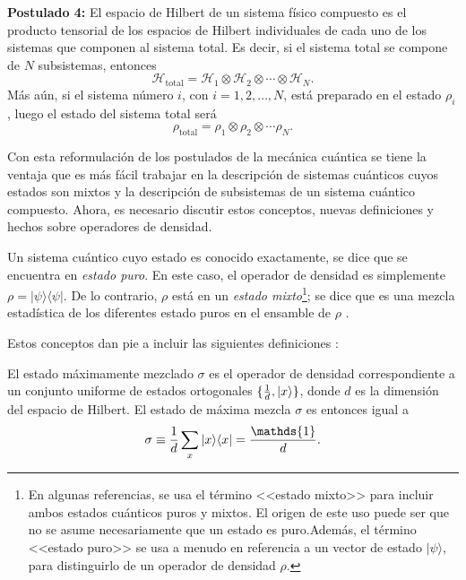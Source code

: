 \textbf{Postulado 4:} El espacio de Hilbert de un sistema físico compuesto es el producto tensorial de los espacios de Hilbert individuales de cada uno de los sistemas que componen al sistema total. Es decir, si el sistema total se compone de $N$ subsistemas, entonces \begin{equation}\label{Htotal4postulado}
	\mathcal{H}_{\text{total}}=\mathcal{H}_1\otimes \mathcal{H}_2\otimes \cdots \otimes \mathcal{H}_N.
\end{equation}
  Más aún, si el sistema número $i$, con $i=1,2,\ldots,N$, está preparado en el estado $\rho_i$, luego el estado del sistema total será  \begin{equation}\label{rhototal4postulado}
	\rho_{\text{total}}=\rho_1\otimes \rho_2 \otimes \cdots \rho_N.
\end{equation}


\setlength{\leftskip}{0pt}

Con esta reformulación de los postulados de la mecánica cuántica se tiene la
ventaja que es más fácil trabajar en la descripción de sistemas cuánticos cuyos estados son mixtos y la descripción de subsistemas de un sistema cuántico compuesto. Ahora, es necesario discutir estos conceptos, nuevas definiciones y hechos sobre operadores de densidad. 

Un sistema cuántico cuyo estado es conocido exactamente, se dice que
se encuentra en \textit{estado puro}. En este caso, el operador de densidad es
simplemente $\rho=|\psi \rangle \langle \psi|$. De lo contrario, $\rho$ está en
un \textit{estado mixto}\footnote{En algunas referencias, se  usa el término
<<estado mixto>> para incluir ambos estados cuánticos puros y mixtos. El origen
de este uso puede ser que no se asume necesariamente que un estado es puro.Además, el término <<estado puro>> se usa a menudo en referencia a un vector de
estado $|\psi\rangle $, para distinguirlo de un operador de densidad	$\rho$.
}; se dice que es una mezcla estadística de los diferentes estado puros en el ensamble de
$\rho$ {\cite{nielsen_chuang_2010}}. 

Estos conceptos dan pie a incluir las siguientes definiciones {\cite{wilde2011classical}}: 
\begin{definition} El estado máximamente mezclado
$\sigma$ es el operador de densidad correspondiente a un conjunto uniforme de
estados ortogonales $\{\frac{1}{d},|x\rangle\}$, donde $d$ es la dimensión del
espacio de Hilbert. El estado de máxima mezcla $\sigma$ es entonces igual a
\begin{equation}\label{maximallyMixedState}
		\sigma \equiv \dfrac{1}{d}\sum_x|x\rala x|=\dfrac{\mathds{1}}{d}.
	\end{equation}
\end{definition}


